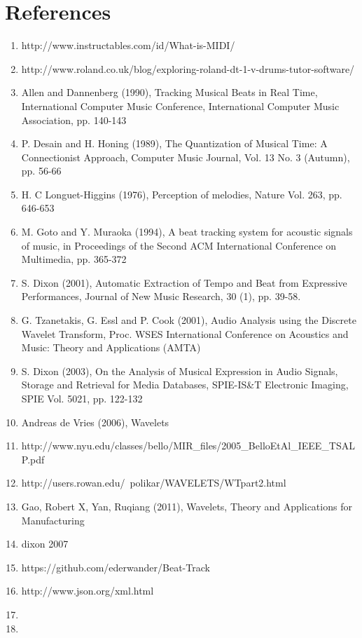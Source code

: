 \documentclass[a4paper, 11pt]{article}
\begin{document}
\maketitle{} 
\section{References}
\begin{enumerate}
\item http://www.instructables.com/id/What-is-MIDI/ %
\item http://www.roland.co.uk/blog/exploring-roland-dt-1-v-drums-tutor-software/ %
\item Allen and Dannenberg (1990), Tracking Musical Beats in Real Time, International Computer Music Conference, International Computer Music Association, pp. 140-143 %
\item P. Desain and H. Honing (1989), The Quantization of Musical Time: A Connectionist Approach, Computer Music Journal, Vol. 13 No. 3 (Autumn), pp. 56-66 %
\item H. C Longuet-Higgins (1976), Perception of melodies, Nature Vol. 263, pp. 646-653 %
\item M. Goto and Y. Muraoka (1994), A beat tracking system for acoustic signals of music, in Proceedings of the Second ACM International Conference on Multimedia, pp. 365-372 %
\item S. Dixon (2001), Automatic Extraction of Tempo and Beat from Expressive Performances, Journal of New Music Research, 30 (1), pp. 39-58. %
\item G. Tzanetakis, G. Essl and P. Cook (2001), Audio Analysis using the Discrete Wavelet Transform, Proc. WSES International Conference on Acoustics and Music: Theory and Applications (AMTA) %
\item S. Dixon (2003), On the Analysis of Musical Expression in Audio Signals, Storage and Retrieval for Media Databases, SPIE-IS\&T Electronic Imaging, SPIE Vol. 5021, pp. 122-132 %
\item Andreas de Vries (2006), Wavelets %
\item http://www.nyu.edu/classes/bello/MIR\_files/2005\_BelloEtAl\_IEEE\_TSALP.pdf %
\item http://users.rowan.edu/~polikar/WAVELETS/WTpart2.html %
\item Gao, Robert X, Yan, Ruqiang (2011), Wavelets, Theory and Applications for Manufacturing %
\item dixon 2007 %
\item https://github.com/ederwander/Beat-Track %
\item http://www.json.org/xml.html %
\item %
\item %


\end{enumerate}
\end{document}
